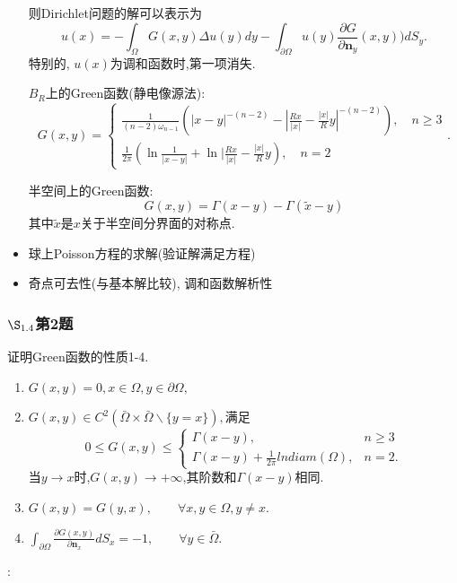 \documentclass[12pt, a4paper]{ctexart}
\begin{document}
\begin{itemize}
        
        则Dirichlet问题的解可以表示为
        $$u(x) = - \int_\Omega G(x, y)\Delta u(y)dy - \int_{\partial\Omega} u(y)\frac{\partial G}{\partial\bm n_y}(x, y))dS_y.$$
        特别的, $u(x)$为调和函数时,第一项消失.
        
        $B_R$上的Green函数(静电像源法):
        $$G(x, y) = \begin{cases}
        \frac1{(n-2)\omega_{n-1}}(|x-y|^{-(n-2)} - |\frac{Rx}{|x|}-\frac{|x|}{R}y|^{-(n-2)}), \quad n\geq 3\\
        \frac1{2\pi}(\ln\frac1{|x-y|} + \ln |\frac{Rx}{|x|} - \frac{|x|}{R}y),\quad n=2
        \end{cases}.$$
        
        半空间上的Green函数:
        $$G(x, y) = \Gamma(x-y) - \Gamma(\tilde{x}-y)$$
        其中$\tilde{x}$是$x$关于半空间分界面的对称点.
        
        \item 球上Poisson方程的求解(验证解满足方程)
        \item 奇点可去性(与基本解比较), 调和函数解析性
    \end{itemize}
    
    
    
        
    \subsubsection{$\S_{1.4}$第2题}
    \kaishu{}证明Green函数的性质1-4.\\
    \begin{enumerate}
    	\item $G(x,y)=0,x \in \Omega,y \in \partial \Omega,
    	$\item $G(x,y) \in C^2(\bar{\Omega}\times \bar{\Omega} \backslash \{y=x\}),$满足$$
    	0\le G(x,y) \le \begin{cases}
    	\Gamma(x-y), &n \ge 3\\
    	\Gamma(x-y)+\frac{1}{2\pi}lndiam(\Omega), &n=2.
    	\end{cases}	$$
    	当$y \to x$时,$G(x,y) \to + \infty$,其阶数和$\Gamma(x-y)$相同.
    	\item $G(x,y)=G(y,x), \qquad \forall x,y \in \Omega, y \ne x.
    	$\item $\int_{\partial \Omega} \frac{\partial G(x,y)}{\partial \bm{n}_x}dS_x =-1, \qquad \forall y \in \bar{\Omega}.$
    \end{enumerate}
    
    
    \songti{}:\\
   
\end{document}
